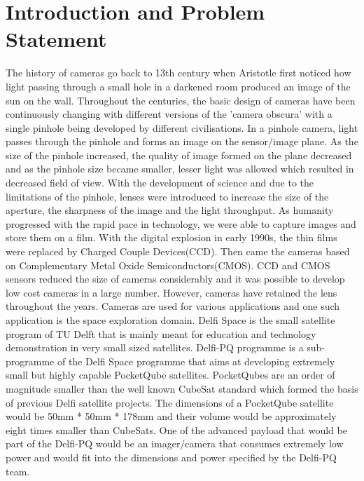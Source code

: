 \chapter{Introduction and Problem Statement}
\label{chp:introduction}
The history of cameras go back to 13th century when Aristotle first noticed how light passing through a small hole in a darkened room produced an image of the sun on the wall. 
Throughout the centuries, the basic design of cameras have been continuously changing with  different versions of the 'camera obscura' with a single pinhole being developed by different civilisations. In a pinhole camera, light passes through the pinhole and forms an image on the sensor/image plane.
As the size of the pinhole increased, the quality of image formed on the plane decreased and as the pinhole size became smaller, lesser light was allowed which resulted in decreased field of view. With the development of science and due to the limitations of the pinhole, lenses were introduced to increase the size of the aperture, the sharpness of the image and the light throughput. As humanity progressed with the rapid pace in technology, we were able to capture images and store them on a film. With the digital explosion in early 1990s, the thin films were replaced by Charged Couple Devices(CCD). Then came the cameras based on Complementary Metal Oxide Semiconductors(CMOS). CCD and CMOS sensors reduced the size of cameras considerably and it was possible to develop low cost cameras in a large number. However, cameras have retained the lens throughout the years. Cameras are used for various applications and one such application is the space exploration domain. Delfi Space is the small satellite program of TU Delft that is mainly meant for education and technology demonstration in very small sized satellites. Delfi-PQ programme is a sub-programme of the Delfi Space programme that aims at developing extremely small but highly capable PocketQube satellites. PocketQubes are an order of magnitude smaller than the well known CubeSat standard which formed the basis of previous Delfi satellite projects. The dimensions of a PocketQube satellite would be 50mm * 50mm * 178mm and their volume would be approximately eight times smaller than CubeSats. 
One of the advanced payload that would be part of the Delfi-PQ would be an imager/camera that consumes extremely low power and would fit into the dimensions and power specified by the Delfi-PQ team.
 
